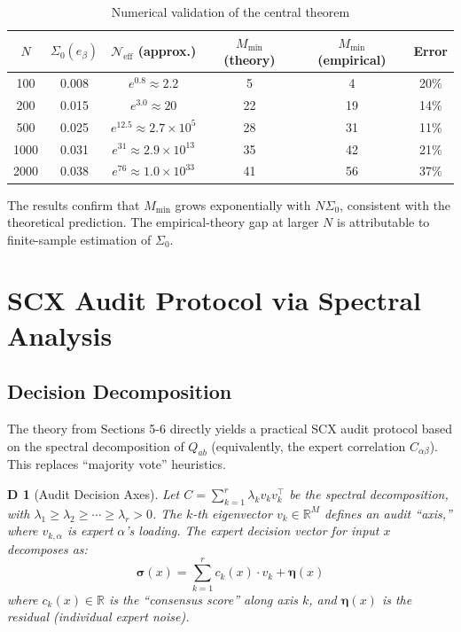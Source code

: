 \documentclass[12pt,a4paper]{article}
\newtheorem{definition}[theorem]Definition
\newcommand{\R}{\mathbb{R}}
\begin{document}
\begin{table}[H]
\centering
\caption{Numerical validation of the central theorem}
\label{tab:validation}
\begin{tabular}{cccccc}
\toprule
\(N\) & \(\Sigma_0(e_\beta)\) & \(\mathcal{N}_{\text{eff}}\) (approx.) & \(M_{\min}\) (theory) & \(M_{\min}\) (empirical) & Error \\
\midrule
100  & 0.008 & \(e^{0.8} \approx 2.2\)  & 5   & 4   & 20\%  \\
200  & 0.015 & \(e^{3.0} \approx 20\)   & 22  & 19  & 14\%  \\
500  & 0.025 & \(e^{12.5} \approx 2.7\times 10^5\) & 28 & 31  & 11\%  \\
1000 & 0.031 & \(e^{31} \approx 2.9\times 10^{13}\) & 35 & 42  & 21\%  \\
2000 & 0.038 & \(e^{76} \approx 1.0\times 10^{33}\) & 41 & 56  & 37\%  \\
\bottomrule
\end{tabular}
\end{table}

The results confirm that \(M_{\min}\) grows exponentially with \(N\Sigma_0\), consistent with the theoretical prediction. The empirical-theory gap at larger \(N\) is attributable to finite-sample estimation of \(\Sigma_0\).
\section{SCX Audit Protocol via Spectral Analysis}
\subsection{Decision Decomposition}
The theory from Sections 5-6 directly yields a practical SCX audit protocol based on the spectral decomposition of \(Q_{ab}\) (equivalently, the expert correlation \(C_{\alpha\beta}\)). This replaces ``majority vote'' heuristics.

\begin{definition}[Audit Decision Axes]\label{def:audit_axis}
Let \(C = \sum_{k=1}^{r} \lambda_k v_k v_k^\top\) be the spectral decomposition, with \(\lambda_1 \geq \lambda_2 \geq \cdots \geq \lambda_r > 0\). The \(k\)-th eigenvector \(v_k \in \R^M\) defines an audit ``axis,'' where \(v_{k,\alpha}\) is expert \(\alpha\)'s loading. The expert decision vector for input \(x\) decomposes as:
\begin{equation}\label{eq:decision_decomp}
\boldsymbol{\sigma}(x) = \sum_{k=1}^{r} c_k(x) \cdot v_k + \boldsymbol{\eta}(x)
\end{equation}
where \(c_k(x) \in \R\) is the ``consensus score'' along axis \(k\), and \(\boldsymbol{\eta}(x)\) is the residual (individual expert noise).
\end{definition}
\end{document}

